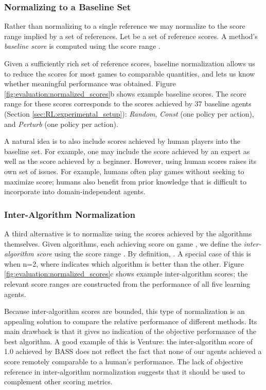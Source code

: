 \documentclass[twoside,11pt]{article}
\newcommand{\gamename}[1]{{\sc #1}}
\begin{document}
\subsubsection{Normalizing to a Baseline Set}

Rather than normalizing to a single reference we may normalize to the score range implied by
a set of references. Let  be a set of reference scores. A 
method's \emph{baseline score} is computed using the score range 
.



Given a sufficiently rich set of reference scores, baseline normalization allows us to reduce the scores for most games to comparable quantities, and lets us know whether meaningful performance was obtained. 
Figure \ref{fig:evaluation:normalized_scores}b shows example baseline scores. The score range for these scores corresponds to the scores achieved by 37 baseline agents (Section \ref{sec:RL:experimental_setup}): \emph{Random}, \emph{Const} (one policy per action), and \emph{Perturb} (one policy per action). 

A natural idea is to also include scores achieved by human players into the baseline set. 
For example, one may include the score achieved by an expert as well as the score achieved by a beginner. However, using human scores raises its own set of issues. 
For example, humans often play games without seeking to maximize score; humans also benefit from prior knowledge that is difficult to incorporate into domain-independent agents.

\subsubsection{Inter-Algorithm Normalization} 


A third alternative is to normalize using the scores achieved by the algorithms themselves. 
Given  algorithms, each achieving score  on game , we define the 
\emph{inter-algorithm score} using the score range 
.
By definition, . A special case of this is when n=2, where 
 indicates which algorithm is better than the other.
Figure \ref{fig:evaluation:normalized_scores}c shows example inter-algorithm scores; the 
relevant score ranges are constructed from the performance of all five learning agents. 

Because inter-algorithm scores are bounded, this type of normalization is an appealing solution to compare the relative performance of different methods.
Its main drawback is that it gives no indication of the objective performance of the best algorithm. 
A good example of this is \gamename{Venture}: the inter-algorithm score of 1.0 achieved by BASS does not reflect the fact that none of our agents achieved a score remotely comparable to a human's performance. The lack of objective reference in inter-algorithm normalization suggests that it should be used to complement other scoring metrics. 
\end{document}
